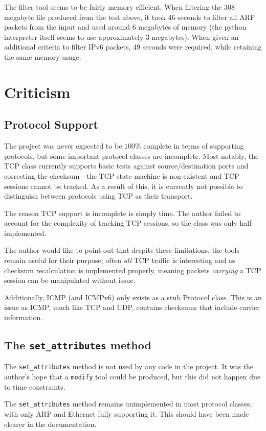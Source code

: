 \documentclass[10pt,a4paper,notitlepage]{report}
\begin{document}
The filter tool seems to be fairly memory efficient. When filtering the 308 megabyte file produced from the test above, it took 46 seconds to filter all ARP packets from the input and used around 6 megabytes of memory (the python interpreter itself seems to use approximately 3 megabytes). When given an additional criteria to filter IPv6 packets, 49 seconds were required, while retaining the same memory usage.

\section{Criticism}
\subsection{Protocol Support}
The project was never expected to be $100\%$ complete in terms of supporting protocols, but some important protocol classes are incomplete. Most notably, the TCP class currently supports basic tests against source/destination ports and correcting the checksum - the TCP state machine is non-existent and TCP sessions cannot be tracked. As a result of this, it is currently not possible to distinguish between protocols using TCP as their transport.

The reason TCP support is incomplete is simply time. The author failed to account for the complexity of tracking TCP sessions, so the class was only half-implemented.

The author would like to point out that despite these limitations, the tools remain useful for their purpose; often \emph{all} TCP traffic is interesting and as checksum recalculation is implemented properly, meaning packets \emph{carrying} a TCP session can be manipulated without issue.

Additionally, ICMP (and ICMPv6) only exists as a stub Protocol class. This is an issue as ICMP, much like TCP and UDP, contains checksums that include carrier information.

\subsection{The \texttt{set_attributes} method}
The \texttt{set_attributes} method is not used by any code in the project. It was the author's hope that a \texttt{modify} tool could be produced, but this did not happen due to time constraints.

The \texttt{set_attributes} method remains unimplemented in most protocol classes, with only ARP and Ethernet fully supporting it. This should have been made clearer in the documentation.
\end{document}
